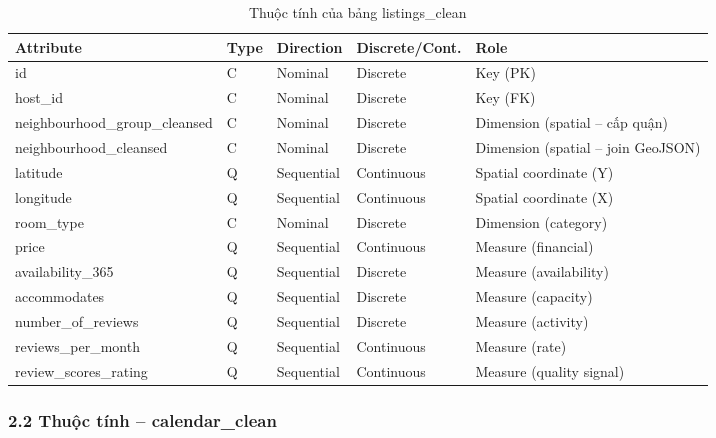 \begin{table}[htbp]
\centering
\caption{Thuộc tính của bảng listings\_clean}
\begin{tabularx}{\textwidth}{@{} l l l l X @{}}
\toprule
\textbf{Attribute} & \textbf{Type} & \textbf{Direction} & \textbf{Discrete/Cont.} & \textbf{Role} \\
\midrule
id                              & C & Nominal    & Discrete   & Key (PK) \\ \hline
host\_id                        & C & Nominal    & Discrete   & Key (FK) \\ \hline
neighbourhood\_group\_cleansed  & C & Nominal    & Discrete   & Dimension (spatial -- cấp quận) \\ \hline
neighbourhood\_cleansed         & C & Nominal    & Discrete   & Dimension (spatial -- join GeoJSON) \\ \hline
latitude                        & Q & Sequential & Continuous & Spatial coordinate (Y) \\ \hline
longitude                       & Q & Sequential & Continuous & Spatial coordinate (X) \\ \hline
room\_type                      & C & Nominal    & Discrete   & Dimension (category) \\ \hline
price                           & Q & Sequential & Continuous & Measure (financial) \\ \hline
availability\_365               & Q & Sequential & Discrete   & Measure (availability) \\ \hline
accommodates                    & Q & Sequential & Discrete   & Measure (capacity) \\ \hline
number\_of\_reviews             & Q & Sequential & Discrete   & Measure (activity) \\ \hline
reviews\_per\_month             & Q & Sequential & Continuous & Measure (rate) \\ \hline
review\_scores\_rating          & Q & Sequential & Continuous & Measure (quality signal) \\ \bottomrule
\end{tabularx}
\end{table}

\subsubsection*{2.2 Thuộc tính -- calendar\_clean}

